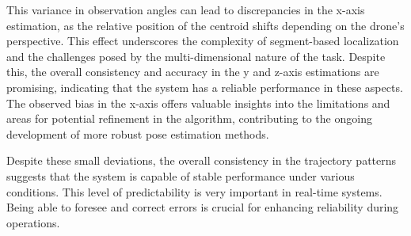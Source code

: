 This variance in observation angles can lead to discrepancies in the x-axis estimation, as the relative position of the centroid shifts depending on the drone's perspective. This effect underscores the complexity of segment-based localization and the challenges posed by the multi-dimensional nature of the task. Despite this, the overall consistency and accuracy in the y and z-axis estimations are promising, indicating that the system has a reliable performance in these aspects. The observed bias in the x-axis offers valuable insights into the limitations and areas for potential refinement in the algorithm, contributing to the ongoing development of more robust pose estimation methods.



Despite these small deviations, the overall consistency in the trajectory patterns suggests that the system is capable of stable performance under various conditions. This level of predictability is very important in real-time systems. Being able to foresee and correct errors is crucial for enhancing reliability during operations.
